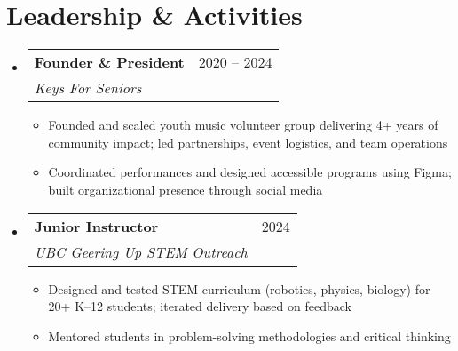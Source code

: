 \documentclass[letterpaper,11pt]{article} %
\makeatletter
\newcommand{\resumeItem}[1]{\item\small{{#1 \vspace{-2pt}}}}
\newcommand{\resumeSubheading}[4]{
  \vspace{-2pt}\item
    \begin{tabular*}{0.97\textwidth}[t]{l@{\extracolsep{\fill}}r}
      \textbf{#1} & #2 \\
      \textit{\small#3} & \textit{\small #4} \\
    \end{tabular*}\vspace{-6pt}
}
\newcommand{\resumeSubHeadingListStart}{\begin{itemize}[leftmargin=0.15in, label={}]}
\newcommand{\resumeSubHeadingListEnd}{\end{itemize}}
\newcommand{\resumeItemListStart}{\begin{itemize}[leftmargin=0.15in]}
\newcommand{\resumeItemListEnd}{\end{itemize}\vspace{-5.5pt}}
\makeatother
\begin{document}
\section{Leadership \& Activities}
  \resumeSubHeadingListStart
    \resumeSubheading
      {Founder \& President}{2020 -- 2024}
      {Keys For Seniors}{}
      \resumeItemListStart
        \resumeItem{Founded and scaled youth music volunteer group delivering 4+ years of community impact; led partnerships, event logistics, and team operations}
        \resumeItem{Coordinated performances and designed accessible programs using Figma; built organizational presence through social media}
      \resumeItemListEnd

    \resumeSubheading
      {Junior Instructor}{2024}
      {UBC Geering Up STEM Outreach}{}
      \resumeItemListStart
        \resumeItem{Designed and tested STEM curriculum (robotics, physics, biology) for 20+ K–12 students; iterated delivery based on feedback}
        \resumeItem{Mentored students in problem-solving methodologies and critical thinking}
      \resumeItemListEnd
  \resumeSubHeadingListEnd

\end{document}
